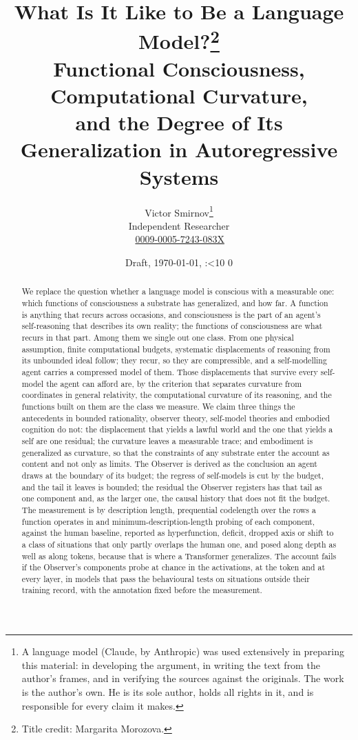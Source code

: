 \documentclass[11pt,a4paper]{article}
\title{What Is It Like to Be a Language Model?\thanks{Title credit: Margarita Morozova.}\\[0.6em]
\large Functional Consciousness, Computational Curvature,\\
and the Degree of Its Generalization in Autoregressive Systems}
\author{Victor Smirnov\thanks{A language model (Claude, by Anthropic) was used extensively in preparing
this material: in developing the argument, in writing the text from the author's frames, and in
verifying the sources against the originals. The work is the author's own. He is its sole author, holds
all rights in it, and is responsible for every claim it makes.}\\[0.3em]
\small Independent Researcher\\
\small \orcidlink{0009-0005-7243-083X}\,\href{https://orcid.org/0009-0005-7243-083X}{0009-0005-7243-083X}}
\date{Draft, \today, \the\draftH:\ifnum\draftM<10 0\fi\the\draftM}
\theoremstyle{definition}
\begin{document}
\maketitle

\begin{abstract}
We replace the question whether a language model is conscious with a measurable one: which functions of
consciousness a substrate has generalized, and how far. A function is anything that recurs across
occasions, and consciousness is the part of an agent's self-reasoning that describes its own reality;
the functions of consciousness are what recurs in that part. Among them we single out one class. From one
physical assumption, finite computational budgets, systematic displacements of reasoning from its
unbounded ideal follow; they recur, so they are compressible, and a self-modelling agent carries a
compressed model of them. Those displacements that survive every self-model the agent can afford are,
by the criterion that separates curvature from coordinates in general relativity, the computational
curvature of its reasoning, and the functions built on them are the class we measure. We claim three things
the antecedents in bounded rationality, observer theory, self-model theories and embodied cognition do
not: the displacement that yields a lawful world and the one that yields a self are one residual; the
curvature leaves a measurable trace; and embodiment is generalized as curvature, so that the constraints
of any substrate enter the account as content and not only as limits. The Observer is derived
as the conclusion an agent draws at the boundary of its budget; the regress of self-models is cut by the
budget, and the tail it leaves is bounded; the residual the Observer registers has that tail as one component and,
as the larger one, the causal history that does not fit the budget. The measurement is by description length, prequential codelength over the rows a function operates in
and minimum-description-length probing of each component, against the human baseline, reported as hyperfunction, deficit, dropped axis or shift to a class of situations that only partly
overlaps the human one, and posed along depth as well as along tokens,
because that is where a Transformer generalizes. The account fails if the Observer's components probe at chance in
the activations, at the token and at every layer, in models that pass the behavioural tests on situations outside their
training record, with the annotation fixed before the measurement.
\end{abstract}

\setcounter{tocdepth}{2}
\tableofcontents












\end{document}
